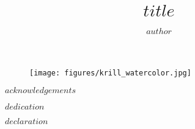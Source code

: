 \documentclass[
$if(draft)$
  draft,
$endif$
$if(fontsize)$
  $fontsize$,
$endif$
$if(margins)$
  $margins$,
$endif$
$if(spacing)$
  $spacing$,
$endif$
$if(clearpagestyle)$
  $clearpagestyle$,
$endif$
$if(notespacing)$
  $notespacing$,
$endif$
$for(classoption)$
  $classoption$$sep$,
$endfor$
]{templates/ut-thesis}
\author{$author$}
\title{$title$}
\begin{document}
\begin{preliminary}

\maketitle


\clearpage
\thispagestyle{empty}
\mbox{}
\newpage

\begin{figure}[ht]
  \centering
  \texttt{[image: figures/krill\_watercolor.jpg]}
\end{figure}

\clearpage
\thispagestyle{empty}
\mbox{}
\newpage


\begin{acknowledgements}
$acknowledgements$ %
\end{acknowledgements}


\begin{dedication}
$dedication$ %
\end{dedication}


\begin{declaration}
$declaration$ %


\end{declaration}
\end{preliminary}
\end{document}
